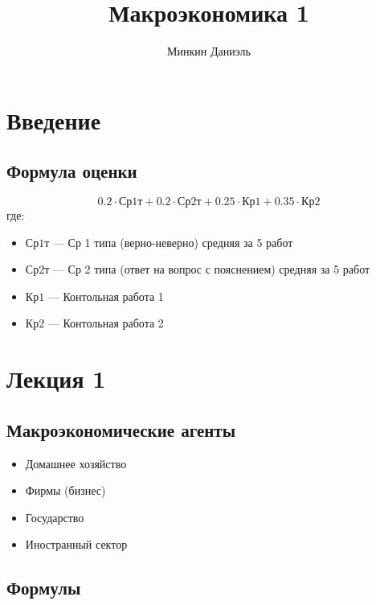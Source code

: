 \documentclass{article}
\title{Макроэкономика 1}
\author{Минкин Даниэль}
\begin{document}
\maketitle

\tableofcontents %


\section{Введение}

\subsection{Формула оценки}

\begin{equation}
    0.2 \cdot \text{Ср1т} + 0.2 \cdot \text{Ср2т} + 0.25 \cdot \text{Кр1} + 0.35 \cdot \text{Кр2}
\end{equation}
где:
\begin{itemize}
    \item $\text{Ср1т}$ --- Ср 1 типа (верно-неверно) средняя за 5 работ
    \item $\text{Ср2т}$ --- Ср 2 типа (ответ на вопрос с пояснением) средняя за 5 работ
    \item $\text{Кр1}$ --- Контольная работа 1
    \item $\text{Кр2}$ --- Контольная работа 2
\end{itemize}


\section{Лекция 1}

\subsection{Макроэкономические агенты}

\begin{itemize}
    \item Домашнее хозяйство
    \item Фирмы (бизнес)
    \item Государство
    \item Иностранный сектор 
\end{itemize}

\subsection{Формулы}
\end{document}

